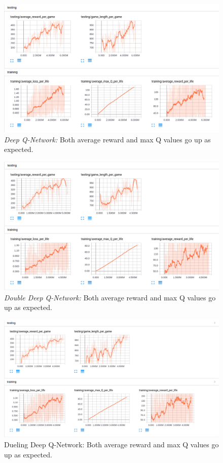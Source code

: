 \documentclass{article}
\begin{document}
\begin{figure}[h]
\centering
\includegraphics[width=\linewidth]{plots/dqn.png}
\caption{{\em Deep Q-Network:} Both average reward and max Q values go up as expected. }
\label{fig:dqn}
\end{figure}

\begin{figure}[h]
\centering
\includegraphics[width=\linewidth]{plots/double.png}
\caption{{\em Double Deep Q-Network:} Both average reward and max Q values go up as expected. }
\label{fig:double}
\end{figure}

\begin{figure}[h]
\centering
\includegraphics[width=\linewidth]{plots/duel.png}
\caption{{Dueling Deep Q-Network:} Both average reward and max Q values go up as expected. }
\label{fig:duel}
\end{figure}
\end{document}
